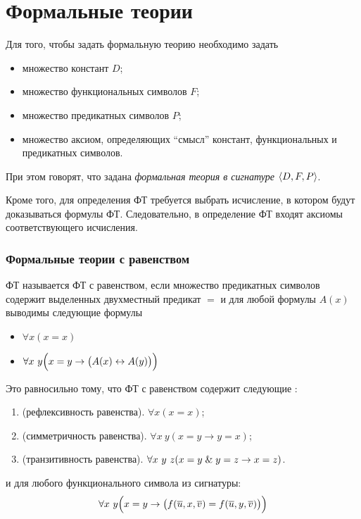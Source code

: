 \chapter{Формальные теории}

Для того, чтобы задать формальную теорию необходимо задать
\begin{itemize}
	\item множество констант $ D $;
	\item множество функциональных символов $ F $;
	\item множество предикатных символов $ P $;
	\item множество аксиом, определяющих ``смысл'' констант, функциональных и предикатных символов.
\end{itemize}

При этом говорят, что задана \emph{формальная теория в сигнатуре} $ \Braket{D, F, P} $.

Кроме того, для определения ФТ требуется выбрать исчисление, в котором будут доказываться формулы ФТ.
Следовательно, в определение ФТ входят аксиомы соответствующего исчисления.

\subsection*{Формальные теории с равенством}

\begin{definition}
	ФТ называется ФТ с равенством, если множество предикатных символов содержит выделенных двухместный предикат $ = $ и для любой формулы $ A(x) $ выводимы следующие формулы
	\begin{itemize}
		\item $ \forall x (x = x) $
		\item $ \forall x ~ y \Bigl(x = y \to \bigl(A(x) \leftrightarrow A(y) \bigr) \Bigr) $
	\end{itemize}

	Это равносильно тому, что ФТ с равенством содержит следующие :
	\begin{enumerate}
		\item[\bt{ER}] (рефлексивность равенства). $ \forall x (x = x) $;
		\item[\bt{ES}] (симметричность равенства). $ \forall x ~ y (x = y \to y = x) $;
		\item[\bt{ET}] (транзитивность равенства). $ \forall x~y~z (x = y \mathrel\& y = z \to x = z) $.
	\end{enumerate}
	и  для любого функционального символа из сигнатуры:
	$$ \forall x~y \Bigl(x = y \to \bigl( f(\overline u, x, \overline v) = f(\overline u, y, \overline v) \bigr) \Bigr) $$
\end{definition}

